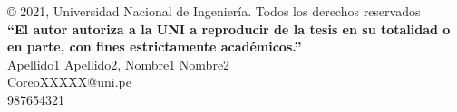 \begin{permisos}

	\onehalfspacing  %
	
	© 2021, Universidad Nacional de Ingeniería. Todos los derechos reservados \\
	\textbf{``El autor autoriza a la UNI a reproducir de la tesis en su totalidad o en parte, con fines estrictamente académicos.''} \\
	Apellido1 Apellido2, Nombre1 Nombre2 \\
	CoreoXXXXX@uni.pe \\
	987654321
	
	\singlespacing  %
	
\end{permisos}
